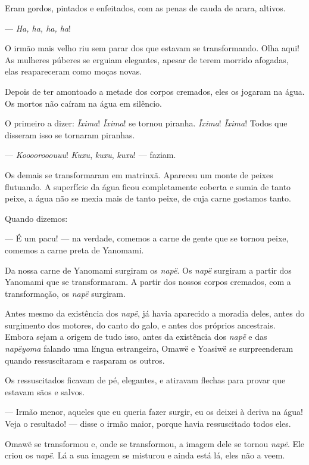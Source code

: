 Eram gordos, pintados e enfeitados, com as penas de cauda de arara,
altivos.

--- \textit{Ha, ha, ha, ha}! 

O irmão mais velho riu sem parar dos que estavam se transformando. Olha
aqui! As mulheres púberes se erguiam elegantes, apesar de terem morrido
afogadas, elas reapareceram como moças novas. 

Depois de ter amontoado a metade dos corpos cremados, eles os jogaram na
água. Os mortos não caíram na água em silêncio. 

O primeiro a dizer: \textit{Ĩxima}! \textit{Ĩxima}! se tornou piranha. \textit{Ĩxima}! \textit{Ĩxima}! Todos
que disseram isso se tornaram piranhas. 

--- \textit{Koooorooouuu}! \textit{Kuxu}, \textit{kuxu}, \textit{kuxu}! --- faziam. 

Os demais se transformaram em matrinxã. Apareceu um monte de peixes
flutuando. A superfície da água ficou completamente coberta e sumia de
tanto peixe, a água não se mexia mais de tanto peixe, de cuja carne gostamos
tanto.

Quando dizemos:

--- É um pacu! --- na verdade, comemos a carne de gente que se tornou
peixe, comemos a carne preta de Yanomami. 

Da nossa carne de Yanomami surgiram os \textit{napë}. Os \textit{napë} surgiram a partir dos Yanomami que se transformaram. A partir dos nossos corpos cremados, com a transformação, os \textit{napë} surgiram. 

Antes mesmo da existência dos \textit{napë}, já havia aparecido a moradia
deles, antes do surgimento dos motores, do canto do galo, e antes dos
próprios ancestrais. Embora sejam a origem de tudo isso, antes da
existência dos \textit{napë} e das \textit{napëyoma} falando uma língua
estrangeira, Omawë e Yoasiwë se surpreenderam quando ressuscitaram e
rasparam os outros. 

Os ressuscitados ficavam de pé, elegantes, e atiravam flechas para
provar que estavam sãos e salvos.

--- Irmão menor, aqueles que eu queria fazer surgir, eu os
deixei à deriva na água! Veja o resultado! --- disse o irmão maior,
porque havia ressuscitado todos eles. 

Omawë se transformou e, onde se transformou, a imagem dele se
tornou \textit{napë}. Ele criou os \textit{napë}. Lá a sua imagem se misturou
e ainda está lá, eles não a veem. 

